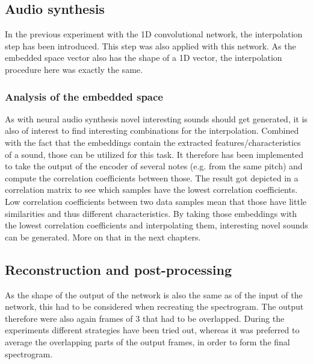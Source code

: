 \subsection{Audio synthesis}
In the previous experiment with the 1D convolutional network, the interpolation step has been introduced. This step was also applied with this network. As the embedded space vector also has the shape of a 1D vector, the interpolation procedure here was exactly the same. 

\subsubsection{Analysis of the embedded space}
As with neural audio synthesis novel interesting sounds should get generated, it is also of interest to find interesting combinations for the interpolation. Combined with the fact that the embeddings contain the extracted features/characteristics of a sound, those can be utilized for this task. It therefore has been implemented to take the output of the encoder of several notes (e.g. from the same pitch) and compute the correlation coefficients between those. The result got depicted in a correlation matrix to see which samples have the lowest correlation coefficients. Low correlation coefficients between two data samples mean that those have little similarities and thus different characteristics. By taking those embeddings with the lowest correlation coefficients and interpolating them, interesting novel sounds can be generated. More on that in the next chapters.

\subsection{Reconstruction and post-processing}
\label{subsec:exp_rec_post}
As the shape of the output of the network is also the same as of the input of the network, this had to be considered when recreating the spectrogram. The output therefore were also again frames of 3 that had to be overlapped. During the experiments different strategies have been tried out, whereas it was preferred to average the overlapping parts of the output frames, in order to form the final spectrogram.

